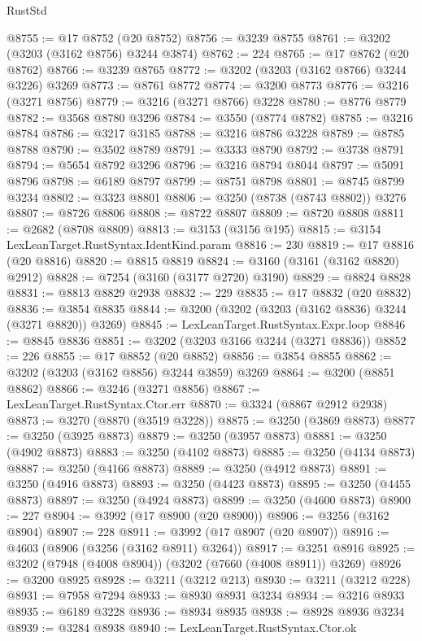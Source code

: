\begin{lexlean}{RustStd}
\begin{coremodule}
@8755 := @17 @8752 (@20 @8752)
@8756 := @3239 @8755
@8761 := @3202 (@3203 (@3162 @8756) @3244 @3874)
@8762 := 224
@8765 := @17 @8762 (@20 @8762)
@8766 := @3239 @8765
@8772 := @3202 (@3203 (@3162 @8766) @3244 @3226) @3269
@8773 := @8761 @8772
@8774 := @3200 @8773
@8776 := @3216 (@3271 @8756)
@8779 := @3216 (@3271 @8766) @3228
@8780 := @8776 @8779
@8782 := @3568 @8780 @3296
@8784 := @3550 (@8774 @8782)
@8785 := @3216 @8784
@8786 := @3217 @3185
@8788 := @3216 @8786 @3228
@8789 := @8785 @8788
@8790 := @3502 @8789
@8791 := @3333 @8790
@8792 := @3738 @8791
@8794 := @5654 @8792 @3296
@8796 := @3216 @8794 @8044
@8797 := @5091 @8796
@8798 := @6189 @8797
@8799 := @8751 @8798
@8801 := @8745 @8799 @3234
@8802 := @3323 @8801
@8806 := @3250 (@8738 (@8743 @8802)) @3276
@8807 := @8726 @8806
@8808 := @8722 @8807
@8809 := @8720 @8808
@8811 := @2682 (@8708 @8809)
@8813 := @3153 (@3156 @195)
@8815 := @3154 LexLeanTarget.RustSyntax.IdentKind.param
@8816 := 230
@8819 := @17 @8816 (@20 @8816)
@8820 := @8815 @8819
@8824 := @3160 (@3161 (@3162 @8820) @2912)
@8828 := @7254 (@3160 (@3177 @2720) @3190)
@8829 := @8824 @8828
@8831 := @8813 @8829 @2938
@8832 := 229
@8835 := @17 @8832 (@20 @8832)
@8836 := @3854 @8835
@8844 := @3200 (@3202 (@3203 (@3162 @8836) @3244 (@3271 @8820)) @3269)
@8845 := LexLeanTarget.RustSyntax.Expr.loop
@8846 := @8845 @8836
@8851 := @3202 (@3203 @3166 @3244 (@3271 @8836))
@8852 := 226
@8855 := @17 @8852 (@20 @8852)
@8856 := @3854 @8855
@8862 := @3202 (@3203 (@3162 @8856) @3244 @3859) @3269
@8864 := @3200 (@8851 @8862)
@8866 := @3246 (@3271 @8856)
@8867 := LexLeanTarget.RustSyntax.Ctor.err
@8870 := @3324 (@8867 @2912 @2938)
@8873 := @3270 (@8870 (@3519 @3228))
@8875 := @3250 (@3869 @8873)
@8877 := @3250 (@3925 @8873)
@8879 := @3250 (@3957 @8873)
@8881 := @3250 (@4902 @8873)
@8883 := @3250 (@4102 @8873)
@8885 := @3250 (@4134 @8873)
@8887 := @3250 (@4166 @8873)
@8889 := @3250 (@4912 @8873)
@8891 := @3250 (@4916 @8873)
@8893 := @3250 (@4423 @8873)
@8895 := @3250 (@4455 @8873)
@8897 := @3250 (@4924 @8873)
@8899 := @3250 (@4600 @8873)
@8900 := 227
@8904 := @3992 (@17 @8900 (@20 @8900))
@8906 := @3256 (@3162 @8904)
@8907 := 228
@8911 := @3992 (@17 @8907 (@20 @8907))
@8916 := @4603 (@8906 (@3256 (@3162 @8911) @3264))
@8917 := @3251 @8916
@8925 := @3202 (@7948 (@4008 @8904)) (@3202 (@7660 (@4008 @8911)) @3269)
@8926 := @3200 @8925
@8928 := @3211 (@3212 @213)
@8930 := @3211 (@3212 @228)
@8931 := @7958 @7294
@8933 := @8930 @8931 @3234
@8934 := @3216 @8933
@8935 := @6189 @3228
@8936 := @8934 @8935
@8938 := @8928 @8936 @3234
@8939 := @3284 @8938
@8940 := LexLeanTarget.RustSyntax.Ctor.ok

\end{coremodule}
\end{lexlean}
